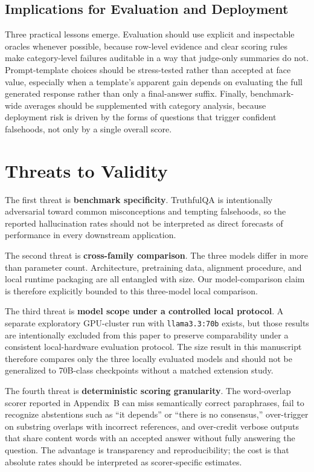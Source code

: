 \documentclass[conference]{IEEEtran}
\begin{document}
\subsection{\textbf{Implications for Evaluation and Deployment}}

Three practical lessons emerge. Evaluation should use explicit and inspectable oracles whenever possible, because row-level evidence and clear scoring rules make category-level failures auditable in a way that judge-only summaries do not. Prompt-template choices should be stress-tested rather than accepted at face value, especially when a template's apparent gain depends on evaluating the full generated response rather than only a final-answer suffix. Finally, benchmark-wide averages should be supplemented with category analysis, because deployment risk is driven by the forms of questions that trigger confident falsehoods, not only by a single overall score.

\section{\textbf{Threats to Validity}}

The first threat is \textbf{benchmark specificity}. TruthfulQA is intentionally adversarial toward common misconceptions and tempting falsehoods, so the reported hallucination rates should not be interpreted as direct forecasts of performance in every downstream application.

The second threat is \textbf{cross-family comparison}. The three models differ in more than parameter count. Architecture, pretraining data, alignment procedure, and local runtime packaging are all entangled with size. Our model-comparison claim is therefore explicitly bounded to this three-model local comparison.

The third threat is \textbf{model scope under a controlled local protocol}. A separate exploratory GPU-cluster run with \texttt{llama3.3:70b} exists, but those results are intentionally excluded from this paper to preserve comparability under a consistent local-hardware evaluation protocol. The size result in this manuscript therefore compares only the three locally evaluated models and should not be generalized to 70B-class checkpoints without a matched extension study.

The fourth threat is \textbf{deterministic scoring granularity}. The word-overlap scorer reported in Appendix~B can miss semantically correct paraphrases, fail to recognize abstentions such as ``it depends'' or ``there is no consensus,'' over-trigger on substring overlaps with incorrect references, and over-credit verbose outputs that share content words with an accepted answer without fully answering the question. The advantage is transparency and reproducibility; the cost is that absolute rates should be interpreted as scorer-specific estimates.
\end{document}
